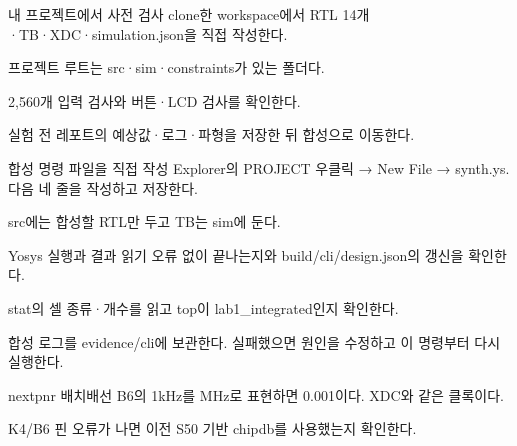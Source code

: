 \begin{frame}{내 프로젝트에서 사전 검사}\relax
\small
clone한 workspace에서 RTL 14개·TB·XDC·simulation.json을 직접 작성한다.\par\vspace{0.22cm}프로젝트 루트는 src·sim·constraints가 있는 폴더다.\par{}
2,560개 입력 검사와 버튼·LCD 검사를 확인한다.\par\vspace{0.22cm}실험 전 레포트의 예상값·로그·파형을 저장한 뒤 합성으로 이동한다.\par
\end{frame}

\begin{frame}{합성 명령 파일을 직접 작성}\relax
\small
Explorer의 PROJECT 우클릭 → New File → synth.ys. 다음 네 줄을 작성하고 저장한다.\par{}
src에는 합성할 RTL만 두고 TB는 sim에 둔다.\par
\end{frame}

\begin{frame}{Yosys 실행과 결과 읽기}\relax
\small
{}
오류 없이 끝나는지와 build/cli/design.json의 갱신을 확인한다.\par\vspace{0.22cm}stat의 셀 종류·개수를 읽고 top이 lab1\_integrated인지 확인한다.\par\vspace{0.22cm}합성 로그를 evidence/cli에 보관한다. 실패했으면 원인을 수정하고 이 명령부터 다시 실행한다.\par
\end{frame}

\begin{frame}{nextpnr 배치배선}\relax
\small
{}
B6의 1kHz를 MHz로 표현하면 0.001이다. XDC와 같은 클록이다.\par\vspace{0.22cm}K4/B6 핀 오류가 나면 이전 S50 기반 chipdb를 사용했는지 확인한다.\par
\end{frame}

